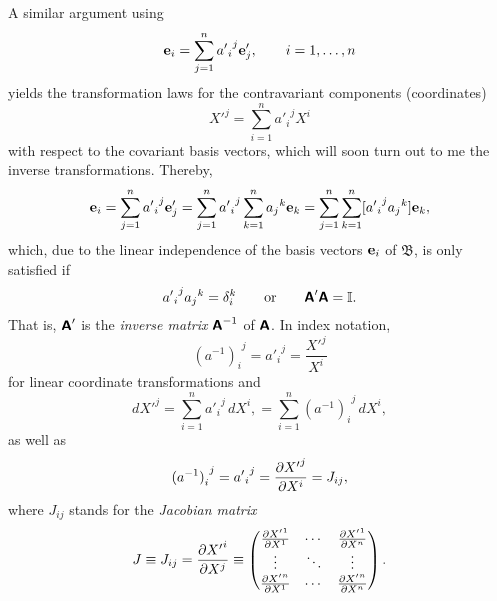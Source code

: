A similar argument using
\begin{equation}
{\bf e}_i=\sum_{j=1}^n {{a'}_i}^j {\bf e}'_j, \qquad i=1,\ldots , n
\label{2012-m-ch-tlcbv}
\end{equation}
yields the transformation laws for the contravariant components (coordinates)
\begin{equation}
{X'}^j   = \sum_{i=1}^n {{a'}_i}^j{X}^i
\label{2015-m-ch-tensor-tlcc}
\end{equation}
with respect to the covariant basis vectors, which will soon turn out to me the inverse transformations.
Thereby,
\begin{equation}
{\bf e}_i=\sum_{j=1}^n {{a'}_i}^j {\bf e}'_j
=\sum_{j=1}^n {{a'}_i}^j \sum_{k=1}^n {a_j}^k {\bf e}_k
=\sum_{j=1}^n \sum_{k=1}^n [{{a'}_i}^j {a_j}^k] {\bf e}_k,
\end{equation}
which, due to the linear independence of the basis vectors ${\bf e}_i$ of ${\mathfrak B}$,
is only satisfied if
\begin{equation}
{{a'}_i}^j {a_j}^k =\delta_i^k
\qquad
{\rm or}
\qquad
\textsf{\textbf{A}}'\textsf{\textbf{A}}={\Bbb I}.
\end{equation}
That is, $\textsf{\textbf{A}}'$ is the {\em inverse matrix}
$\textsf{\textbf{A}}^{-1}$  of $\textsf{\textbf{A}}$. In index notation,
\begin{equation}
{(a^{-1})_i}^j = {{a'}_i}^j =\frac{ {X'}^j }{   X^i}
\label{2001-mu-tensor-tl2}
\end{equation}
for linear   coordinate transformations and
\begin{equation}
d{X'}^j   =
\sum_{i=1}^n {{a'}_i}^j\, d{X}^i,
=
\sum_{i=1}^n {{({a^{-1}})}_i}^j\, d{X}^i,
\end{equation}
as well as
\begin{equation}
{{(a^{-1})}_i}^j =
{{a'}_i}^j =
{\partial {X'}^j \over \partial X^i}   =J_{ij},
\label{2001-mu-tensor-tl2nl}
\end{equation}
where $J_{ij}$ stands for
the {\em Jacobian matrix}
\begin{equation}
J\equiv
J_{ij}={\partial {X'}^i\over \partial {X}^j }
\equiv
\begin{pmatrix}
{\partial {X'}^1\over \partial {X}^1}&\cdots&{\partial {X'}^1\over \partial {X}^n}\\
\vdots&\ddots &\vdots\\
{\partial {X'}^n\over \partial {X}^1}&\cdots&{\partial {X'}^n\over \partial {X}^n}
\end{pmatrix} .
\label{2013-m-t-jm}
\end{equation}



